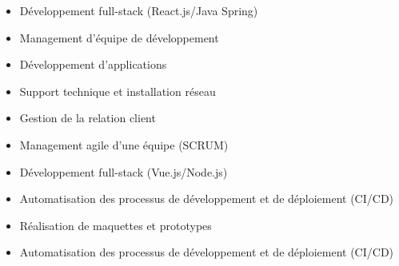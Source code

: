 \documentclass[10pt,a4paper,ragged2e,withhyper]{altacv}
\begin{document}


\makecvheader


\begin{paracol}{2}


\begin{itemize}
    \item Développement full-stack (React.js/Java Spring)
    \item Management d'équipe de développement
\end{itemize}

\divider

\begin{itemize}
    \item Développement d'applications
    \item Support technique et installation réseau
    \item Gestion de la relation client
\end{itemize}


\begin{itemize}
    \item Management agile d'une équipe (SCRUM)
    \item Développement full-stack (Vue.js/Node.js)
    \item Automatisation des processus de développement et de déploiement (CI/CD)
    \item Réalisation de maquettes et prototypes
\end{itemize}

\divider

\begin{itemize}
    \item Automatisation des processus de développement et de déploiement (CI/CD)
\end{itemize}

\divider


\end{paracol}
\end{document}
